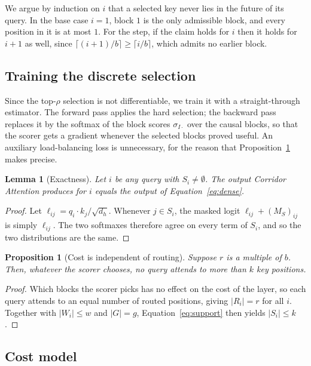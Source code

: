 \documentclass[11pt]{article}
\newtheorem{lemma}{Lemma}
\newtheorem{proposition}{Proposition}
\begin{document}
We argue by induction on $i$ that a selected key never lies in the future of
its query. In the base case $i = 1$, block $1$ is the only admissible block,
and every position in it is at most $1$. For the step, if the claim holds for
$i$ then it holds for $i + 1$ as well, since
$\lceil (i+1)/b \rceil \ge \lceil i/b \rceil$, which admits no earlier block.

\subsection{Training the discrete selection}\label{sec:training}

Since the top-$\rho$ selection is not differentiable, we train it with a
straight-through estimator. The forward pass applies the hard selection; the
backward pass replaces it by the softmax of the block scores
$\sigma_{I\cdot}$ over the causal blocks, so that the scorer gets a gradient
whenever the selected blocks proved useful. An auxiliary load-balancing loss
is unnecessary, for the reason that Proposition~\ref{prop:cost} makes
precise.

\begin{lemma}[Exactness]\label{lem:exact}
Let $i$ be any query with $S_i \ne \emptyset$. The output Corridor Attention
produces for $i$ equals the output of Equation~\eqref{eq:dense}.
\end{lemma}
\begin{proof}
Let $\ell_{ij} = q_i \cdot k_j / \sqrt{d_h}$. Whenever $j \in S_i$, the masked
logit $\ell_{ij} + (M_S)_{ij}$ is simply $\ell_{ij}$. The two softmaxes
therefore agree on every term of $S_i$, and so the two distributions are the
same.
\end{proof}

\begin{proposition}[Cost is independent of routing]\label{prop:cost}
Suppose $r$ is a multiple of $b$. Then, whatever the scorer chooses, no query
attends to more than $k$ key positions.
\end{proposition}
\begin{proof}
Which blocks the scorer picks has no effect on the cost of the layer, so each
query attends to an equal number of routed positions, giving $|R_i| = r$ for
all $i$. Together with $|W_i| \le w$ and $|G| = g$,
Equation~\eqref{eq:support} then yields $|S_i| \le k$.
\end{proof}

\subsection{Cost model}\label{sec:cost}
\end{document}
